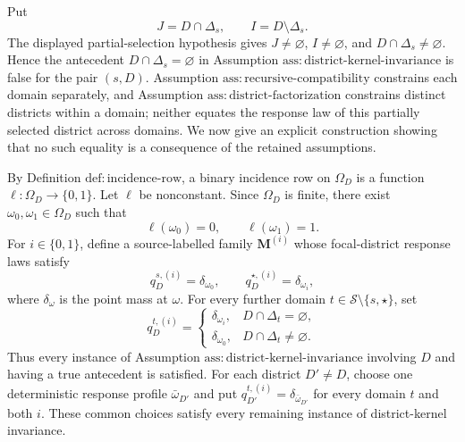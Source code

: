 Put
\[
J=D\cap\Delta_s,
\qquad
I=D\setminus\Delta_s.
\]
The displayed partial-selection hypothesis gives \(J\ne\varnothing\), \(I\ne\varnothing\), and \(D\cap\Delta_s\ne\varnothing\). Hence the antecedent \(D\cap\Delta_s=\varnothing\) in Assumption \(\mathrm{ass:district\text{-}kernel\text{-}invariance}\) is false for the pair \((s,D)\). Assumption \(\mathrm{ass:recursive\text{-}compatibility}\) constrains each domain separately, and Assumption \(\mathrm{ass:district\text{-}factorization}\) constrains distinct districts within a domain; neither equates the response law of this partially selected district across domains. We now give an explicit construction showing that no such equality is a consequence of the retained assumptions.

By Definition \(\mathrm{def:incidence\text{-}row}\), a binary incidence row on \(\Omega_D\) is a function \(\ell:\Omega_D\to\{0,1\}\). Let \(\ell\) be nonconstant. Since \(\Omega_D\) is finite, there exist \(\omega_0,\omega_1\in\Omega_D\) such that
\[
\ell(\omega_0)=0,
\qquad
\ell(\omega_1)=1.
\tag{1}
\]
For \(i\in\{0,1\}\), define a source-labelled family \(\mathbf M^{(i)}\) whose focal-district response laws satisfy
\[
q_D^{s,(i)}=\delta_{\omega_0},
\qquad
q_D^{\star,(i)}=\delta_{\omega_i},
\tag{2}
\]
where \(\delta_\omega\) is the point mass at \(\omega\). For every further domain \(t\in\mathcal S\setminus\{s,\star\}\), set
\[
q_D^{t,(i)}=
\begin{cases}
\delta_{\omega_i},&D\cap\Delta_t=\varnothing,\\
\delta_{\omega_0},&D\cap\Delta_t\ne\varnothing.
\end{cases}
\tag{3}
\]
Thus every instance of Assumption \(\mathrm{ass:district\text{-}kernel\text{-}invariance}\) involving \(D\) and having a true antecedent is satisfied. For each district \(D'\ne D\), choose one deterministic response profile \(\bar\omega_{D'}\) and put \(q_{D'}^{t,(i)}=\delta_{\bar\omega_{D'}}\) for every domain \(t\) and both \(i\). These common choices satisfy every remaining instance of district-kernel invariance.

